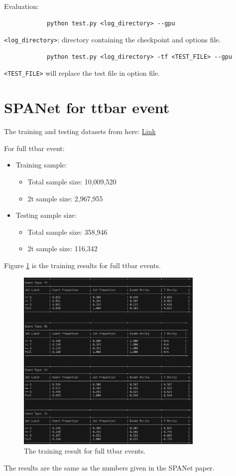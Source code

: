 \documentclass[12pt]{article}
\begin{document}
		Evaluation:
		\begin{verbatim}
			python test.py <log_directory> --gpu
		\end{verbatim}
		\verb+<log_directory>+: directory containing the checkpoint and options file.
		\begin{verbatim}
			python test.py <log_directory> -tf <TEST_FILE> --gpu
		\end{verbatim}
		\verb+<TEST_FILE>+ will replace the test file in option file.

\section{SPANet for ttbar event}%
\label{sec:spanet_for_ttbar_event}
	The training and testing datasets from here: \href{http://mlphysics.ics.uci.edu/data/2021_ttbar/}{Link}

	For full ttbar event:
	\begin{itemize}
		\item Training sample:
		\begin{itemize}
			\item Total sample size: 10,009,520
			\item 2t sample size: 2,967,955
		\end{itemize}
		\item Testing sample size: 
			\begin{itemize}
				\item Total sample size: 358,946
				\item 2t sample size: 116,342
			\end{itemize}
	\end{itemize}

	Figure \ref{fig:full_ttbar_result} is the training results for full ttbar events. 
	\begin{figure}[htpb]
		\centering
		\includegraphics[width=0.8\textwidth]{full_ttbar_training_result.png}
		\caption{The training result for full ttbar events.}
		\label{fig:full_ttbar_result}
	\end{figure}
	The results are the same as the numbers given in the SPANet paper.
\end{document}

